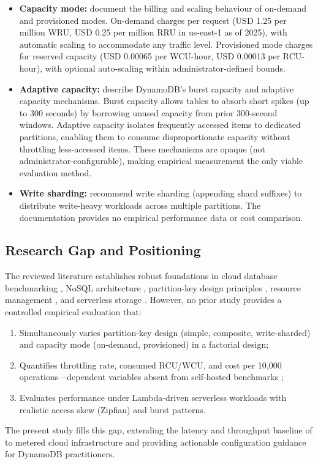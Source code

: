 \begin{itemize}
    \item \textbf{Capacity mode:} \citet{aws2025capacitymode} document the billing and scaling behaviour of on-demand and provisioned modes. On-demand charges per request (USD 1.25 per million WRU, USD 0.25 per million RRU in us-east-1 as of 2025), with automatic scaling to accommodate any traffic level. Provisioned mode charges for reserved capacity (USD 0.00065 per WCU-hour, USD 0.00013 per RCU-hour), with optional auto-scaling within administrator-defined bounds.
    \item \textbf{Adaptive capacity:} \citet{aws2025adaptive} describe DynamoDB's burst capacity and adaptive capacity mechanisms. Burst capacity allows tables to absorb short spikes (up to 300 seconds) by borrowing unused capacity from prior 300-second windows. Adaptive capacity isolates frequently accessed items to dedicated partitions, enabling them to consume disproportionate capacity without throttling less-accessed items. These mechanisms are opaque (not administrator-configurable), making empirical measurement the only viable evaluation method.
    \item \textbf{Write sharding:} \citet{aws2025sharding} recommend write sharding (appending shard suffixes) to distribute write-heavy workloads across multiple partitions. The documentation provides no empirical performance data or cost comparison.
\end{itemize}

\subsection{Research Gap and Positioning}

The reviewed literature establishes robust foundations in cloud database benchmarking \citep{vanrenen2023cloud, bodner2025serverless}, NoSQL architecture \citep{elhemali2022dynamodb, lei2024xstor}, partition-key design principles \citep{eldeeb2022neuroshard, kanellis2025f2}, resource management \citep{haubenschild2025oltp, barnhart2024aurora}, and serverless storage \citep{pang2024disaggregated, durner2023object}. However, no prior study provides a controlled empirical evaluation that:

\begin{enumerate}
    \item Simultaneously varies partition-key design (simple, composite, write-sharded) and capacity mode (on-demand, provisioned) in a factorial design;
    \item Quantifies throttling rate, consumed RCU/WCU, and cost per 10,000 operations—dependent variables absent from self-hosted benchmarks \citep{pantelic2026benchmarking};
    \item Evaluates performance under Lambda-driven serverless workloads with realistic access skew (Zipfian) and burst patterns.
\end{enumerate}

The present study fills this gap, extending the latency and throughput baseline of \citet{pantelic2026benchmarking} to metered cloud infrastructure and providing actionable configuration guidance for DynamoDB practitioners.
